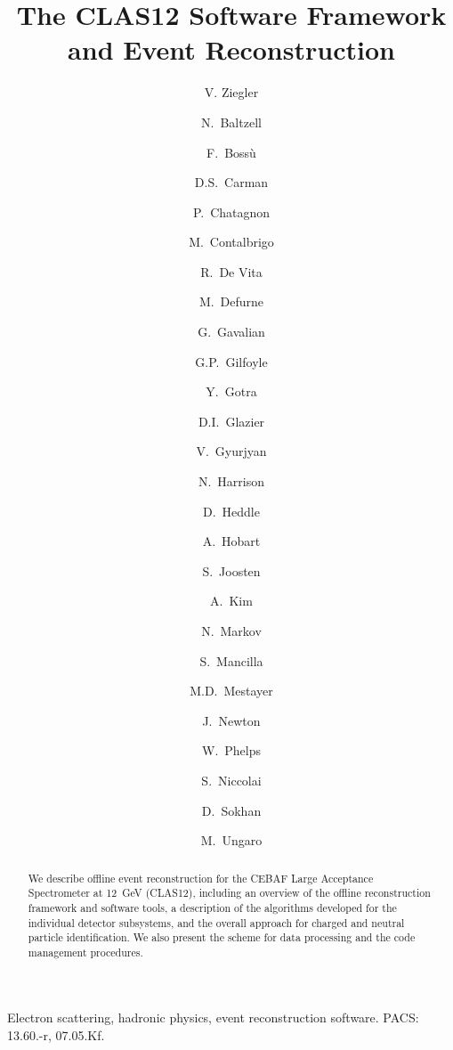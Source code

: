 \documentclass[3p,times,twocolumn]{elsarticle}
\begin{document}
\begin{frontmatter}

\title{The CLAS12 Software Framework and Event Reconstruction}

\author[JLab]{V. Ziegler }
\author[JLab]{N.~Baltzell}
\author[Saclay]{F.~Boss\`u}
\author[JLab]{D.S.~Carman}
\author[IPNO]{P.~Chatagnon}
\author[INFNFE]{M.~Contalbrigo}
\author[INFNGE]{R.~De Vita}
\author[Saclay]{M.~Defurne}
\author[JLab]{G.~Gavalian}
\author[RichU]{G.P.~Gilfoyle}
\author[JLab]{Y.~Gotra}
\author[Glasgow]{D.I.~Glazier}
\author[JLab]{V.~Gyurjyan}
\author[JLab]{N.~Harrison}
\author[CNU]{D.~Heddle}
\author[IPNO]{A.~Hobart}
\author[ANL]{S.~Joosten}
\author[UConn]{A.~Kim}
\author[JLab]{N.~Markov}
\author[Chile]{S.~Mancilla}
\author[JLab]{M.D.~Mestayer}
\author[ODU]{J.~Newton}
\author[CNU]{W.~Phelps}
\author[IPNO]{S.~Niccolai}
\author[Glasgow]{D.~Sokhan}
\author[JLab]{M.~Ungaro}

\address[JLab]{Thomas Jefferson National Accelerator Facility, Newport News, VA 23606, USA}
\address[Saclay]{CEA-Saclay, Univ. Paris-Sud, Universit\'e Paris-Saclay, Gif-sur-Yvettes, France}
\address[IPNO]{Institut de Physique Nucl\'eaire, CNRS-IN2P3, Univ. Paris-Sud, Universit\'e Paris-Saclay,
91406 Orsay Cedex, France}
\address[INFNFE]{INFN, Sezione di Ferrara, 44100 Ferrara, Italy}
\address[INFNGE]{INFN, Sezione di Genova, 16146 Genova, Italy}
\address[RichU]{University of Richmond, Richmond, 23173 VA , USA}
\address[Glasgow]{University of Glasgow, Glasgow G12 8QQ, United Kingdom}
\address[CNU]{Christopher Newport University, Newport News, 23606 VA , USA}
\address[ANL]{Argonne National Laboratory, Chicago, 60439 IL, USA}
\address[UConn]{University of Connecticut, Storrs, CT 06269, USA}
\address[Chile]{Universidad T\'{e}cnica Federico Santa Mar\'{i}a, Valpara\'{i}so, 2390123, Chile}
\address[ODU]{Old Dominion University, Norfolk, 23529 VA, USA}



\begin{abstract}
  We describe offline event reconstruction for the CEBAF Large Acceptance Spectrometer at 12~GeV (CLAS12),
  including an overview of the offline reconstruction framework and software tools, a description of the algorithms
  developed for the individual detector subsystems, and the overall approach for charged and neutral particle
  identification. We also present the scheme for data processing and the code management procedures.
\end{abstract}

\begin{keyword}
Electron scattering, hadronic physics, event reconstruction software. PACS: 13.60.-r, 07.05.Kf.
\end{keyword}

\end{frontmatter}
\end{document}
